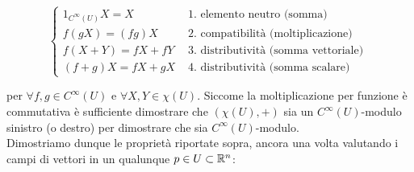 \begin{equation}
	\begin{cases}
		1_{C^{\infty}(U)} X = X & \text{ 1. elemento neutro (somma) }\\
		f (g X) = (f g) X & \text{ 2. compatibilità (moltiplicazione) }\\
		f (X+Y) = f X + f Y & \text{ 3. distributività (somma vettoriale) }\\
		(f+g) X = f X + g X & \text{ 4. distributività (somma scalare) }
	\end{cases}
\end{equation}

per $ \forall f,g \in C^{\infty}(U) $ e $ \forall X,Y \in \chi(U) $. Siccome la moltiplicazione per funzione è commutativa è sufficiente dimostrare che $ (\chi(U),+) $ sia un $ C^{\infty}(U) $-modulo sinistro (o destro) per dimostrare che sia $ C^{\infty}(U) $-modulo.\\
Dimostriamo dunque le proprietà riportate sopra, ancora una volta valutando i campi di vettori in un qualunque $ p \in U \subset \mathbb{R}^{n} $:

